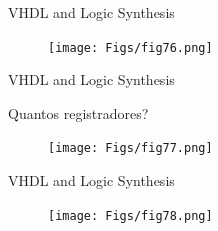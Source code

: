 \documentclass[aspectratio=169]{beamer}
\begin{document}
\begin{frame}{VHDL and Logic Synthesis}
	\justifying
	
	
	\begin{figure}[h]
		\centering
		\texttt{[image: Figs/fig76.png]}
	\end{figure}
	
\end{frame}
\begin{frame}{VHDL and Logic Synthesis}
	\justifying
	
	Quantos registradores?
	
	\begin{figure}[h]
		\centering
		\texttt{[image: Figs/fig77.png]}
	\end{figure}
	
\end{frame}
\begin{frame}{VHDL and Logic Synthesis}
	\justifying
	
	
	\begin{figure}[h]
		\centering
		\texttt{[image: Figs/fig78.png]}
	\end{figure}
	
\end{frame}
%	
%	
%	
%	
%	
%	
%	
%	
%	
\end{document}
